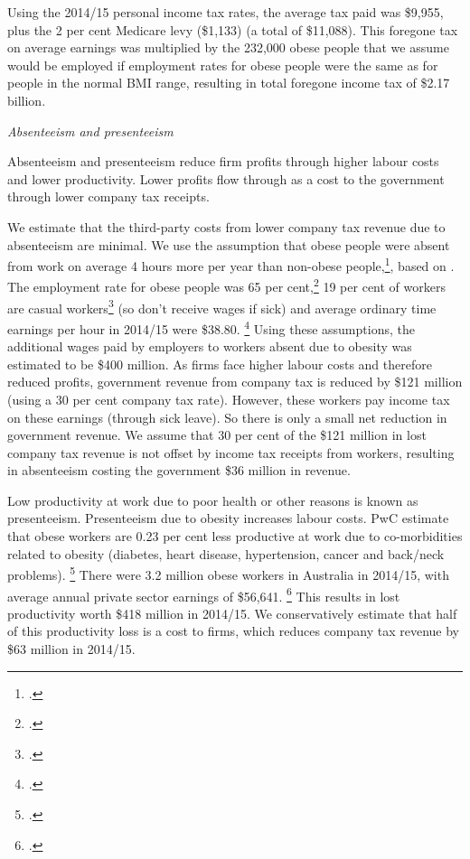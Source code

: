 \documentclass[embargoed]{grattan}
\begin{document}
Using the 2014/15 personal income tax rates, the average tax paid was \$9,955, plus the 2 per cent Medicare levy (\$1,133) (a total of \$11,088).
This foregone tax on average earnings was multiplied by the 232,000 obese people that we assume would be employed if employment rates for obese people were the same as for people in the normal BMI range, resulting in total foregone income tax of \$2.17 billion.

\emph{Absenteeism and presenteeism}

Absenteeism and presenteeism reduce firm profits through higher labour costs and lower productivity.
Lower profits flow through as a cost to the government through lower company tax receipts.

We estimate that the third-party costs from lower company tax revenue due to absenteeism are minimal.
We use the assumption that obese people were absent from work on average 4 hours more per year than non-obese people,\footcite[][55]{PwC2015Weighingcostobesity}, based on \textcite{ABS20134364055002AustralianHealth}.
The employment rate for obese people was 65 per cent,\footcite{ABS2013436405503AustralianHealth} 19 per cent of workers are casual workers\footcite{ABS201563333} (so don't receive wages if sick) and average ordinary time earnings per hour in 2014/15 were \$38.80.%
\footcite{ABS201663020AverageWeekly} Using these assumptions, the additional wages paid by employers to workers absent due to obesity was estimated to be \$400 million.
As firms face higher labour costs and therefore reduced profits, government revenue from company tax is reduced by \$121 million (using a 30 per cent company tax rate).
However, these workers pay income tax on these earnings (through sick leave).
So there is only a small net reduction in government revenue.
We assume that 30 per cent of the \$121 million in lost company tax revenue is not offset by income tax receipts from workers, resulting in absenteeism costing the government \$36 million in revenue.

Low productivity at work due to poor health or other reasons is known as presenteeism.
Presenteeism due to obesity increases labour costs.
PwC estimate that obese workers are 0.23 per cent less productive at work due to co-morbidities related to obesity (diabetes, heart disease, hypertension, cancer and back/neck problems).%
\footcite[][56]{PwC2015Weighingcostobesity} There were 3.2 million obese workers in Australia in 2014/15, with average annual private sector earnings of \$56,641.%
\footcite{ABS201663020AverageWeekly} This results in lost productivity worth \$418 million in 2014/15.
We conservatively estimate that half of this productivity loss is a cost to firms, which reduces company tax revenue by \$63 million in 2014/15.
\end{document}
